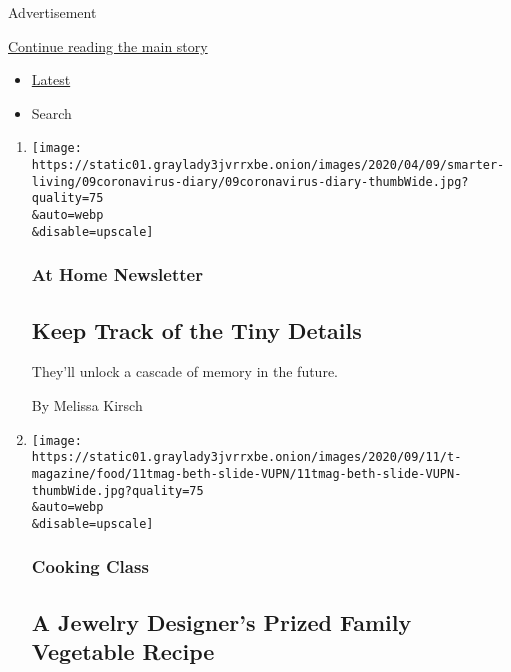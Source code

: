 Advertisement

\protect\hyperlink{after-mid1}{Continue reading the main story}

\begin{itemize}
\tightlist
\item
  \protect\hyperlink{stream-panel}{Latest}
\item
  Search
\end{itemize}

\begin{enumerate}
\def\labelenumi{\arabic{enumi}.}
\item
  \href{/2020/09/11/at-home/newsletter.html}{}

  \texttt{[image: https://static01.graylady3jvrrxbe.onion/images/2020/04/09/smarter-living/09coronavirus-diary/09coronavirus-diary-thumbWide.jpg?quality=75\\\&auto=webp\\\&disable=upscale]}

  \hypertarget{at-home-newsletter}{%
  \subsubsection{At Home Newsletter}\label{at-home-newsletter}}

  \hypertarget{keep-track-of-the-tiny-details}{%
  \subsection{Keep Track of the Tiny
  Details}\label{keep-track-of-the-tiny-details}}

  They'll unlock a cascade of memory in the future.

  By Melissa Kirsch
\item
  \href{/2020/09/11/t-magazine/beth-bugdaycay-foundrae-recipe.html}{}

  \texttt{[image: https://static01.graylady3jvrrxbe.onion/images/2020/09/11/t-magazine/food/11tmag-beth-slide-VUPN/11tmag-beth-slide-VUPN-thumbWide.jpg?quality=75\\\&auto=webp\\\&disable=upscale]}

  \hypertarget{cooking-class}{%
  \subsubsection{Cooking Class}\label{cooking-class}}

  \hypertarget{a-jewelry-designers-prized-family-vegetable-recipe}{%
  \subsection{A Jewelry Designer's Prized Family Vegetable
  Recipe}\label{a-jewelry-designers-prized-family-vegetable-recipe}}


\end{enumerate}
